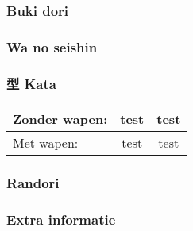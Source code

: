 \subsubsection{Buki dori}

\subsubsection{Wa no seishin}

\subsubsection{型 Kata}
\begin{table}[H]
\begin{center}
\begin{tabular}{lcc}
    Zonder wapen: & test & test \\
    \hline
    Met wapen: & test & test
\end{tabular}
\end{center}
\label{kata_dan_2}
\end{table}

\subsubsection{Randori}

\subsubsection{Extra informatie}
